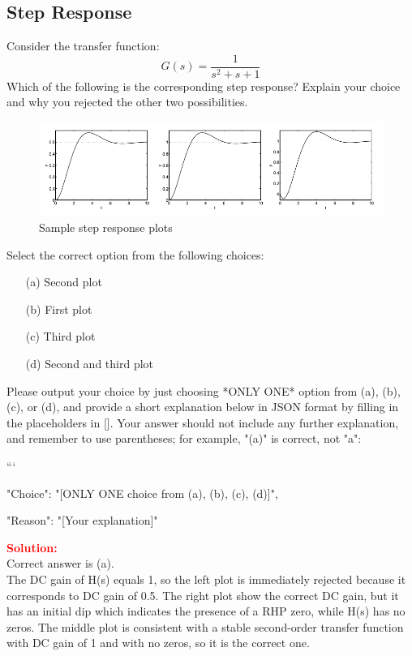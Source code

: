 \documentclass[12pt]{article}
\begin{document}
\subsection{Step Response}

Consider the transfer function:
\[
G(s)=\frac{1}{s^2+s+1}
\]
Which of the following is the corresponding step response? Explain your choice and why you rejected the other two possibilities.

\begin{figure}[h!]
    \centering
    \includegraphics[width=1\linewidth]{figs/3.21.png}
    \caption{Sample step response plots}
    \label{fig:prb50}
\end{figure}
Select the correct option from the following choices:
\begin{enumerate}
    \item [(a)] Second plot
    \item [(b)] First plot
    \item [(c)] Third plot 
    \item [(d)] Second and third plot
\end{enumerate}

Please output your choice by just choosing *ONLY ONE* option from (a), (b), (c), or (d), and provide a short explanation below in JSON format by filling in the placeholders in []. Your answer should not include any further explanation, and remember to use parentheses; for example, "(a)" is correct, not "a": 

```
{

"Choice": "[ONLY ONE choice from (a), (b), (c), (d)]",

"Reason": "[Your explanation]"

}



\textbf{\textcolor{red}{Solution:}} \\
Correct answer is (a).\\
The DC gain of H(s) equals 1, so the left plot is immediately rejected because it corresponds to DC gain of 0.5. The right plot show the correct DC gain, but it has an initial dip which indicates the presence of a RHP zero, while H(s) has no zeros. The middle plot is consistent with a stable second-order transfer function with DC gain of 1 and with no zeros, so it is the correct one.
\clearpage
\end{document}

